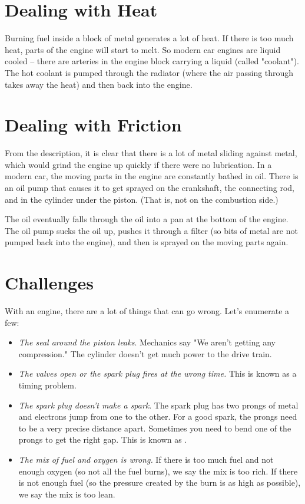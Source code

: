 \section{Dealing with Heat}

Burning fuel inside a block of metal generates a lot of heat.  If there is too much heat,  parts of the engine will start to melt.  So modern car engines are liquid cooled -- there are arteries in the engine block carrying a liquid (called "coolant").  The hot coolant is pumped through the radiator (where the air passing through takes away the heat) and then back into the engine.

\section{Dealing with Friction}


From the description,  it is clear that there is a lot of metal sliding against metal,  which would grind the engine up quickly if there were no lubrication.  In a modern car, the moving parts in the engine are constantly bathed in oil.  There is an oil pump that causes it to get sprayed on the crankshaft, the connecting rod, and in the cylinder under the piston. (That is, not on the combustion side.)  

The oil eventually falls through the oil into a pan at the bottom of the engine.   The oil pump sucks the oil up,  pushes it through a filter (so bits of metal are not pumped back into the engine),  and then is sprayed on the moving parts again.

\section{Challenges}

With an engine, there are a lot of things that can go wrong.  Let's enumerate a few:

\begin{itemize}

\item \textit{The seal around the piston leaks}.  Mechanics say "We aren't getting any compression."  The cylinder doesn't get much power to the drive train.

\item \textit{The valves open or the spark plug fires at the wrong time.}  This is known as a timing problem. 

\item \textit{The spark plug doesn't make a spark}.   The spark plug has two prongs of metal and electrons jump from one to the other.  For a good spark,  the prongs need to be a very precise distance apart.  Sometimes you need to bend one of the prongs to get the right gap.  This is known as .

\item \textit{The mix of fuel and oxygen is wrong.}  If there is too much fuel and not enough oxygen (so not all the fuel burns),  we say the mix is too rich.  If there is not enough fuel (so the pressure created by the burn is as high as possible),   we say the mix is too lean.

\end{itemize}
